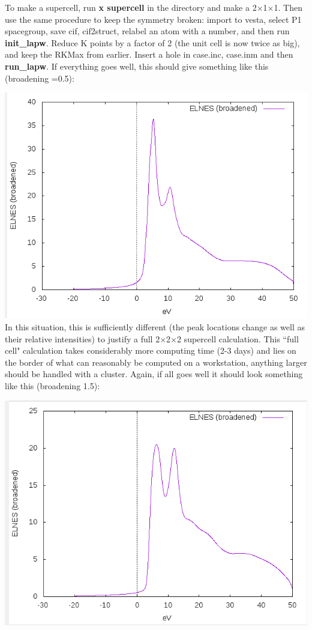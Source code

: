\documentclass[12pt]{article}
\begin{document}
To make a supercell, run \textbf{x supercell} in the directory and make a 2$\times$1$\times$1.  Then use the same procedure to keep the symmetry broken: import to vesta, select P1 spacegroup, save cif, cif2struct, relabel an atom with a number, and then run \textbf{init\_lapw}.  Reduce K points by a factor of 2 (the unit cell is now twice as big), and keep the RKMax from earlier.  Insert a hole in case.inc, case.inm and then \textbf{run\_lapw}.  If everything goes well, this should give something like this (broadening =0.5):  

\includegraphics[scale=0.4]{./images/211_cell_hole_elnes.png}\\

In this situation, this is sufficiently different (the peak locations change as well as their relative intensities) to justify a full 2$\times$2$\times$2 supercell calculation.  This ``full cell" calculation takes considerably more computing time (2-3 days) and lies on the border of what can reasonably be computed on a workstation, anything larger should be handled with a cluster.  Again, if all goes well it should look something like this (broadening 1.5):

\includegraphics[scale=0.4]{./images/222_cell_hole_elnes.png}\\
\end{document}
